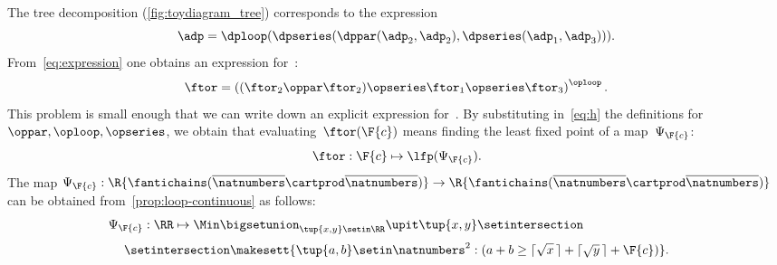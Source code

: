 \begin{marginfigure}
\caption{}
\label{fig:toydiagram_tree}
\end{marginfigure}

The tree decomposition (\cref{fig:toydiagram_tree}) corresponds to the expression
%
\begin{equation}
    \adp=\dploop(\dpseries(\dppar(\adp_{2},\adp_{2}),\dpseries(\adp_{1},\adp_{3}))).
    \label{eq:expression}
\end{equation}
%
From~\cref{eq:expression} one obtains an expression for~\ftor:
%
\begin{equation}
    \ftor=\left((\ftor_{2}\oppar\ftor_{2})\opseries\ftor_{1}\opseries\ftor_{3}\right)^{\oploop}.
    \label{eq:h}
\end{equation}
%
This problem is small enough that we can write down an explicit expression for~\ftor.
By substituting in~\cref{eq:h} the definitions for $\oppar, \oploop, \opseries$, we obtain that evaluating~$\ftor(\F{c})$ means finding the least fixed point of a map~$\Psi_{\F{c}}$:
%
\begin{equation}
    \ftor:\F{c}\mapsto\lfp(\Psi_{\F{c}}).
\end{equation}
%
The map $\Psi_{\F{c}}:\R{\fantichains(\overline{\natnumbers}\cartprod\overline{\natnumbers})}\rightarrow\R{\fantichains(\overline{\natnumbers}\cartprod\overline{\natnumbers})}$ can be obtained from~\cref{prop:loop-continuous} as follows:
%
\begin{equation}
    \Psi_{\F{c}}:\RR\mapsto\Min\bigsetunion_{\tup{ x,y} \setin\RR}\upit\tup{ x,y} \setintersection\qquad\qquad\qquad\qquad
\end{equation}
%
\begin{equation}
    \setintersection \makesett{
        \tup{ a,b} \setin\natnumbers^{2}:
        (
        a+b\geq\lceil\sqrt{x}\,\rceil+\lceil\sqrt{y}\,\rceil+\F{c}
        )
    }.
\end{equation}
%

